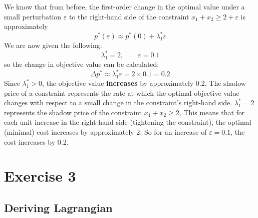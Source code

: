 \documentclass[12pt]{article}
\begin{document}
We know that from before, the first-order change in the optimal value under a small perturbation $\varepsilon$ to the right-hand side of the constraint $x_{1} + x_{2} \geq 2 + \varepsilon$ is approximately \begin{equation*}
    p^{*}(\varepsilon) \approx p^{*} (0) + \lambda_1^{*} \varepsilon
\end{equation*} We are now given the following: \begin{equation*}
    \lambda_1^* = 2, \qquad \varepsilon = 0.1 
\end{equation*} so the change in objective value can be calculated: \begin{equation*}
    \Delta p^* \approx \lambda_1^* \varepsilon = 2 \times 0.1 = 0.2 
\end{equation*} Since $\lambda_1^{*} > 0$, the objective value \textbf{increases} by approximately 0.2. The shadow price of a constraint represents the rate at which the optimal objective value changes with respect to a small change in the constraint's right-hand side. $\lambda_1^* = 2$ represents the shadow price of the constraint $x_{1} + x_{2} \geq 2$, This means that for each unit increase in the right-hand side (tightening the constraint), the optimal (minimal) cost increases by approximately 2. So for an increase of $\varepsilon = 0.1$, the cost increases by 0.2.

\section*{Exercise 3}

\subsection*{Deriving Lagrangian}
\end{document}
